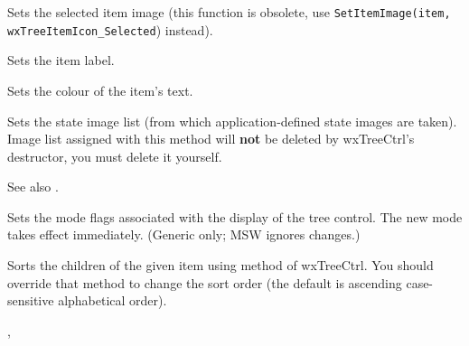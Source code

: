 
Sets the selected item image (this function is obsolete, use {\tt SetItemImage(item, wxTreeItemIcon\_Selected}) instead).


\label{wxtreectrlsetitemtext}


Sets the item label.


\label{wxtreectrlsetitemtextcolour}


Sets the colour of the item's text.


\label{wxtreectrlsetstateimagelist}


Sets the state image list (from which application-defined state images are taken).
Image list assigned with this method will
{\bf not} be deleted by wxTreeCtrl's destructor, you must delete it yourself.

See also .

\label{wxtreectrlsetwindowstyle}


Sets the mode flags associated with the display of the tree control.
The new mode takes effect immediately.
(Generic only; MSW ignores changes.)


\label{wxtreectrlsortchildren}


Sorts the children of the given item using
 method of wxTreeCtrl. You
should override that method to change the sort order (the default is ascending
case-sensitive alphabetical order).


, 



